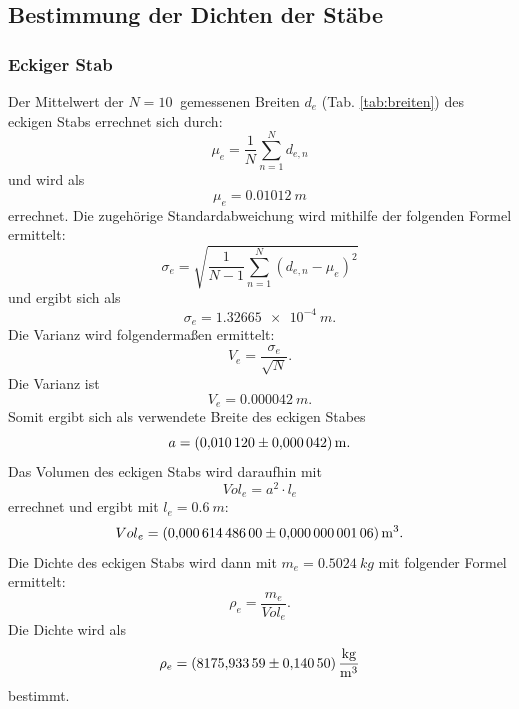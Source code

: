 \subsection{Bestimmung der Dichten der Stäbe}

\subsubsection{Eckiger Stab}
Der Mittelwert der $N=\SI{10}{}$ gemessenen Breiten $d_{e}$ (Tab. \ref{tab:breiten}) des eckigen Stabs errechnet sich durch:
\begin{equation}
  \mu_{e} = \frac{1}{N} \sum_{n=1}^{N} d_{e, n}
  \label{eqn:emu}
\end{equation}
und wird als
\begin{equation*}
  \mu_{e}= \SI{0.01012}{m}
\end{equation*}
errechnet.
Die zugehörige Standardabweichung wird mithilfe der folgenden Formel ermittelt:
\begin{equation}
  \sigma_{e} =  \sqrt{  \frac{1}{N-1}  \sum_{n=1}^{N} (d_{e, n} - \mu_{e})^2 }
  \label{eqn:esigma}
\end{equation}
und ergibt sich als
\begin{equation*}
  \sigma_{e}= \SI{1.32665e-4}{m}.
\end{equation*}
Die Varianz wird folgendermaßen ermittelt:
\begin{equation}
  V_{e}= \frac{\sigma_{e}}{\sqrt{N}}.
  \label{eqn:evar}
\end{equation}
Die Varianz ist
\begin{equation*}
  V_{e}= \SI{0.000042}{m}.
\end{equation*}
Somit ergibt sich als verwendete Breite des eckigen Stabes
\begin{equation*}
  a=\SI{0.01012 \pm 0.000042}{m}.
\end{equation*}
Das Volumen des eckigen Stabs wird daraufhin mit
\begin{equation}
  Vol_{e}=a^2 \cdot l_{e}
  \label{eqn:evol}
\end{equation}
errechnet und ergibt mit $l_{e}= \SI{0.6}{m}$:
\begin{equation*}
  {Vol}_{e}= \SI{0.000614486 \pm 0.00000000106}{m^3}.
\end{equation*}
Die Dichte des eckigen Stabs wird dann mit $m_{e}=\SI{0.5024}{kg}$ mit folgender Formel ermittelt:
\begin{equation}
  \rho_{e}= \frac{m_{e}}{Vol_{e}}.
  \label{eqn:erho}
\end{equation}
Die Dichte wird als
\begin{equation*}
  \rho_{e}=\SI{8175.93359 \pm 0.14050}{\frac{kg}{m^3}}
\end{equation*}
bestimmt.


